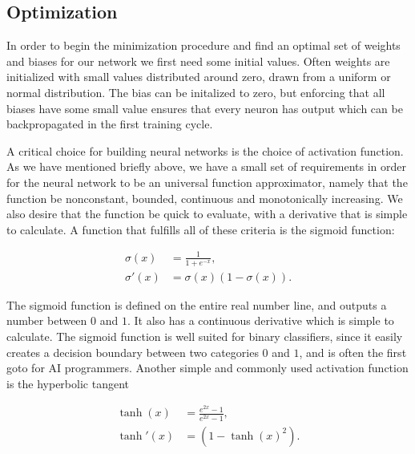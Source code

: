\subsection{Optimization}
In order to begin the minimization procedure and find an optimal
set of weights and biases for our network we first need some initial values.
Often weights are initialized with small values distributed around zero,
drawn from a uniform or normal distribution. The bias can be initalized to zero,
but enforcing that all biases have some small value ensures that every
neuron has output which can be backpropagated in the first training cycle.
\par
A critical choice for building neural networks is the choice of activation function.
As we have mentioned briefly above, we have a small set of requirements in order
for the neural network to be an universal function approximator, namely
that the function be nonconstant, bounded, continuous and monotonically increasing.
We also desire that the function be quick to evaluate, with a derivative that
is simple to calculate.
A function that fulfills all of these criteria is the sigmoid function:

\begin{equation}
    \begin{split}
        \sigma(x) &= \frac{1}{1 + e^{-x}} , \\
        \sigma '(x) &= \sigma(x)(1 - \sigma(x)) .
    \end{split}
\end{equation}

The sigmoid function is defined on the entire real number line,
and outputs a number between $0$ and $1$. It also has a continuous derivative
which is simple to calculate. The sigmoid function is well suited for binary
classifiers, since it easily creates a decision boundary between two categories
$0$ and $1$, and is often the first goto for AI programmers.
Another simple and commonly used activation function is the hyperbolic tangent

\begin{equation}
    \begin{split}
        \tanh(x) &= \frac{e^{2x} -1}{e^{2x} - 1} , \\
        \tanh '(x) &= (1 - \tanh(x)^2) .
    \end{split}
\end{equation}

